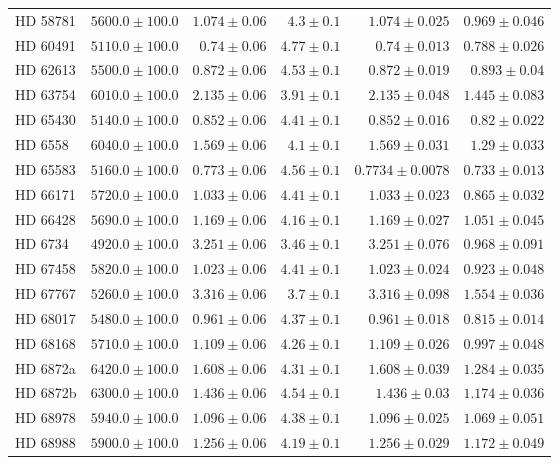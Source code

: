 \begin{longtable*}{lrrrrr}
HD 58781 & $5600.0\pm 100.0$ & $1.074\pm 0.06$ & $4.3\pm 0.1$ & $1.074\pm 0.025$ & $0.969\pm 0.046$ \\ 
HD 60491 & $5110.0\pm 100.0$ & $0.74\pm 0.06$ & $4.77\pm 0.1$ & $0.74\pm 0.013$ & $0.788\pm 0.026$ \\ 
HD 62613 & $5500.0\pm 100.0$ & $0.872\pm 0.06$ & $4.53\pm 0.1$ & $0.872\pm 0.019$ & $0.893\pm 0.04$ \\ 
HD 63754 & $6010.0\pm 100.0$ & $2.135\pm 0.06$ & $3.91\pm 0.1$ & $2.135\pm 0.048$ & $1.445\pm 0.083$ \\ 
HD 65430 & $5140.0\pm 100.0$ & $0.852\pm 0.06$ & $4.41\pm 0.1$ & $0.852\pm 0.016$ & $0.82\pm 0.022$ \\ 
HD 6558 & $6040.0\pm 100.0$ & $1.569\pm 0.06$ & $4.1\pm 0.1$ & $1.569\pm 0.031$ & $1.29\pm 0.033$ \\ 
HD 65583 & $5160.0\pm 100.0$ & $0.773\pm 0.06$ & $4.56\pm 0.1$ & $0.7734\pm 0.0078$ & $0.733\pm 0.013$ \\ 
HD 66171 & $5720.0\pm 100.0$ & $1.033\pm 0.06$ & $4.41\pm 0.1$ & $1.033\pm 0.023$ & $0.865\pm 0.032$ \\ 
HD 66428 & $5690.0\pm 100.0$ & $1.169\pm 0.06$ & $4.16\pm 0.1$ & $1.169\pm 0.027$ & $1.051\pm 0.045$ \\ 
HD 6734 & $4920.0\pm 100.0$ & $3.251\pm 0.06$ & $3.46\pm 0.1$ & $3.251\pm 0.076$ & $0.968\pm 0.091$ \\ 
HD 67458 & $5820.0\pm 100.0$ & $1.023\pm 0.06$ & $4.41\pm 0.1$ & $1.023\pm 0.024$ & $0.923\pm 0.048$ \\ 
HD 67767 & $5260.0\pm 100.0$ & $3.316\pm 0.06$ & $3.7\pm 0.1$ & $3.316\pm 0.098$ & $1.554\pm 0.036$ \\ 
HD 68017 & $5480.0\pm 100.0$ & $0.961\pm 0.06$ & $4.37\pm 0.1$ & $0.961\pm 0.018$ & $0.815\pm 0.014$ \\ 
HD 68168 & $5710.0\pm 100.0$ & $1.109\pm 0.06$ & $4.26\pm 0.1$ & $1.109\pm 0.026$ & $0.997\pm 0.048$ \\ 
HD 6872a & $6420.0\pm 100.0$ & $1.608\pm 0.06$ & $4.31\pm 0.1$ & $1.608\pm 0.039$ & $1.284\pm 0.035$ \\ 
HD 6872b & $6300.0\pm 100.0$ & $1.436\pm 0.06$ & $4.54\pm 0.1$ & $1.436\pm 0.03$ & $1.174\pm 0.036$ \\ 
HD 68978 & $5940.0\pm 100.0$ & $1.096\pm 0.06$ & $4.38\pm 0.1$ & $1.096\pm 0.025$ & $1.069\pm 0.051$ \\ 
HD 68988 & $5900.0\pm 100.0$ & $1.256\pm 0.06$ & $4.19\pm 0.1$ & $1.256\pm 0.029$ & $1.172\pm 0.049$ \\ 

\end{longtable*}
